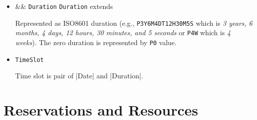 \documentclass[a4paper]{report}
\newcommand{\APIcode}[1]{\lstinline[style=myinline]!#1!}
\newcommand{\APIcmd}[1]{%
\item \APIcode{#1}%

}
\newcommand{\APItype}[2]{
  \item %
  \ifx&#2& \APIcode{#1} \else \APIcode{#1} extends \APIcode{#2} \fi %
    
}
\newcommand{\APIexample}{%

\textbf{Example:}
}
\newenvironment{APIdef}{\begin{itemize}}{\end{itemize}}
\begin{document}
\begin{APIdef}
\APIexample We want to define a maximum future time that can be specified as part of some request and we know the precise date (e.g., the date since a resource will not be available for any request). We can specify it by |Date| or by |AutoDate| as follows:

\begin{verbatim}
date = autoDate = 20121231
\end{verbatim}

\APIexample We want to define the maximum amount of time since the request moment (e.g., the user can specify dates which are at most 4 months ahead). We can specify it only by |AutoDate| as follows:

\begin{verbatim}
autoDate = Now
autoDate.duration = P4M
\end{verbatim}

\APItype{Duration}{}
Represented as ISO8601 duration (e.g., \verb|P3Y6M4DT12H30M5S| which is \textit{3 years, 6 months, 4 days, 12 hours, 30 minutes, and 5 seconds} or \verb|P4W| which is \textit{4 weeks}). The zero duration is represented by \verb|P0| value.


\APIcmd{TimeSlot}
Time slot is pair of |Date| and |Duration|.

\end{APIdef}


\section{Reservations and Resources}
\end{document}
